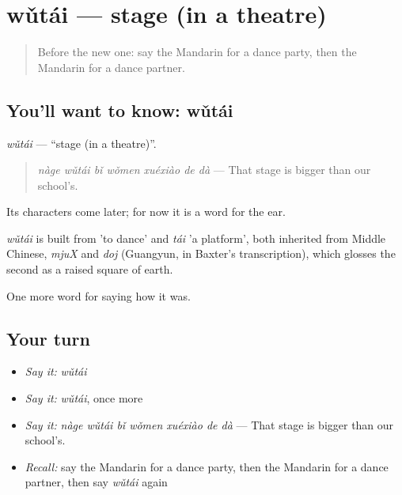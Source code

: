 \section[wǔtái]{wǔtái — stage (in a theatre)}

\label{lesson:ZH-C505-wutai}



\begin{quote}
Before the new one: say the Mandarin for a dance party, then the Mandarin for a dance partner.
\end{quote}

\subsection*{You'll want to know: wǔtái}
\emph{wǔtái} — \textquotedblleft{}stage (in a theatre)\textquotedblright{}.

\begin{quote}
\emph{nàge wǔtái bǐ wǒmen xuéxiào de dà} — That stage is bigger than our school's.
\end{quote}

Its characters come later; for now it is a word for the ear.

\begin{cousinweb}
\emph{wǔtái} is built from  'to dance' and \emph{tái} 'a platform', both inherited from Middle Chinese, \emph{mjuX} and \emph{doj} (Guangyun, in Baxter's transcription), which glosses the second as a raised square of earth.
\end{cousinweb}

\begin{grammarlens}[title={What you've built}]
One more word for saying how it was.
\end{grammarlens}

\subsection*{Your turn}
\begin{itemize}
\raggedright
  \item \emph{Say it:} \emph{wǔtái}
  \item \emph{Say it:} \emph{wǔtái}, once more
  \item \emph{Say it:} \emph{nàge wǔtái bǐ wǒmen xuéxiào de dà} — That stage is bigger than our school's.
  \item \emph{Recall:} say the Mandarin for a dance party, then the Mandarin for a dance partner, then say \emph{wǔtái} again
\end{itemize}

